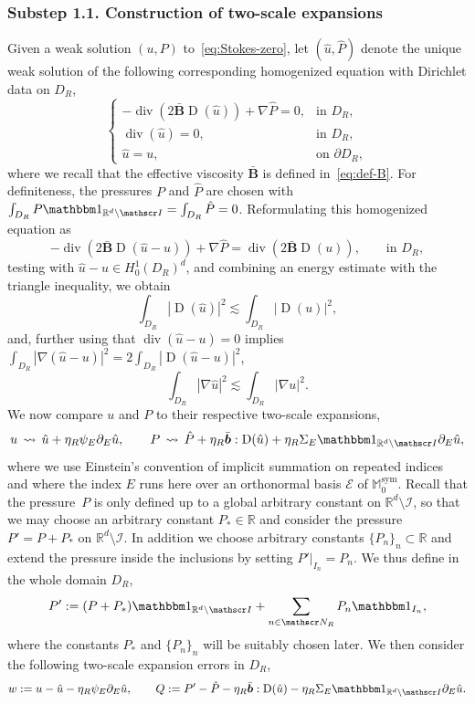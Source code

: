 \documentclass[10pt]{amsart}
\let\mathcal\mathscr
\let\mathds\mathbbm
\theoremstyle{plain}
\theoremstyle{definition}
\newcommand{\Ec}{\mathcal E}
\newcommand{\R}{\mathbb R}
\newcommand{\Ic}{\mathcal I}
\newcommand{\Md}{\mathbb M}
\newcommand{\Nc}{\mathcal N}
\newcommand{\D}{\operatorname{D}}
\newcommand{\bb}{\bar{\boldsymbol b}}
\newcommand{\Bb}{\bar{\boldsymbol B}}
\newcommand{\Div}{{\operatorname{div}}}
\newcommand{\Sym}{{\operatorname{sym}}}
\newcommand{\substep}[1]{\subsubsection*{Substep #1}}
\begin{document}
\substep{1.1. Construction of two-scale expansions}
Given a weak solution $(u,P)$ to~\eqref{eq:Stokes-zero},
let $(\hat u,\hat P)$ denote the unique weak solution of the following corresponding homogenized equation with Dirichlet data on $D_R$,
\begin{equation}\label{e.p1.4}
\begin{cases}
-\Div(2\Bb \D( \hat u))+\nabla\hat P=0 ,&\text{in $D_R$},\\
\Div(\hat u)=0,&\text{in $D_R$},\\
\hat u=u,&\text{on $\partial D_R$},
\end{cases}
\end{equation}
where we recall that the effective viscosity $\Bb$ is defined in~\eqref{eq:def-B}.
For definiteness, the pressures $P$ and $\hat P$ are chosen with $\int_{D_R} P\mathds1_{\R^d\setminus\Ic}=\int_{D_R}\hat P=0$.
Reformulating this homogenized equation as
\[-\Div(2\Bb \D( \hat u-u))+\nabla\hat P=\Div(2\Bb \D(u)),\qquad\text{in $D_R$},\]
testing with $\hat u-u\in H^1_0(D_R)^d$, and combining an energy estimate with the triangle inequality, we obtain
\begin{equation*}
\int_{D_R} |\!\D( \hat u)|^2 \lesssim \int_{D_R}|\!\D( u)|^2,
\end{equation*}
and, further using that $\Div(\hat u-u)=0$ implies $\int_{D_R}|\nabla(\hat u-u)|^2=2\int_{D_R}|\!\D(\hat u-u)|^2$,
\begin{equation}\label{e.p1.12+}
\int_{D_R} |\nabla\hat u|^2 \lesssim \int_{D_R}|\nabla u|^2.
\end{equation}
We now compare $u$ and $P$ to their respective two-scale expansions,
\[u\,\leadsto\,\hat u + \eta_R \psi_E \partial_E \hat u,\qquad P\,\leadsto\,\hat P+\eta_R\bb:\D(\hat u)+\eta_R \Sigma_E\mathds1_{\R^d\setminus\Ic} \partial_E \hat u,\]
where we use Einstein's convention of implicit summation on repeated indices and where the index $E$ runs here over an orthonormal basis $\Ec$ of $\Md_0^\Sym$.
Recall that the pressure~$P$ is only defined up to a global arbitrary constant on ${\R^d\setminus\Ic}$,
so that we may choose an arbitrary constant $P_*\in\R$ and consider the pressure $P'=P+P_*$ on ${\R^d\setminus\Ic}$.
In addition we choose arbitrary constants $\{P_n\}_n\subset\R$ and extend the pressure inside the inclusions by setting $P'|_{I_n}=P_n$. We thus define in the whole domain $D_R$,
\begin{equation}\label{eq:cst-press}
P':=(P+P_*)\mathds1_{{\R^d\setminus\Ic}}+\sum_{n\in\Nc_R}P_n \mathds 1_{I_n},
\end{equation}
where the constants $P_*$ and $\{P_n\}_n$ will be suitably chosen later.
We then consider the following two-scale expansion errors in $D_R$,
\begin{equation}\label{eq:def-wQ}
w:=u-\hat u - \eta_R \psi_E \partial_E \hat u,\qquad
Q:=P'-\hat P-\eta_R\bb:\D(\hat u)-\eta_R \Sigma_E\mathds1_{\R^d\setminus\Ic} \partial_E \hat u.
\end{equation}
\end{document}
